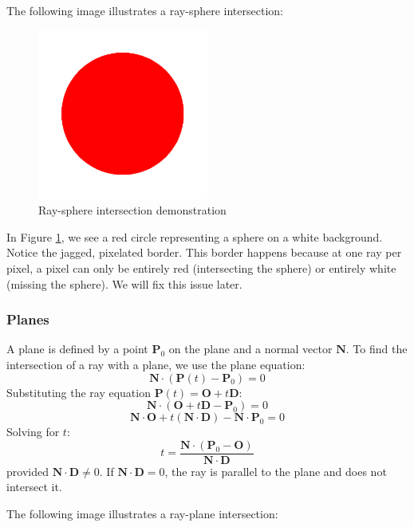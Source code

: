 \documentclass[12pt]{article}
\begin{document}
The following image illustrates a ray-sphere intersection:

\begin{figure}[H]
    \centering
    \includegraphics[width=0.5\textwidth]{images/intersections/ray_sphere_intersection.png}
    \caption{Ray-sphere intersection demonstration}
    \label{fig:raysphereintersection}
\end{figure}

In Figure \ref{fig:raysphereintersection}, we see a red circle representing a sphere on a white background. Notice the jagged, pixelated border. This border happens because at one ray per pixel, a pixel can only be entirely red (intersecting the sphere) or entirely white (missing the sphere). We will fix this issue later.

\subsubsection{Planes}
A plane is defined by a point \(\mathbf{P}_0\) on the plane and a normal vector \(\mathbf{N}\). To find the intersection of a ray with a plane, we use the plane equation:
\[
    \mathbf{N} \cdot \left( \mathbf{P}(t) - \mathbf{P}_0 \right) = 0
\]
Substituting the ray equation \(\mathbf{P}(t) = \mathbf{O} + t\mathbf{D}\):
\[
    \mathbf{N} \cdot \left( \mathbf{O} + t\mathbf{D} - \mathbf{P}_0 \right) = 0
\]
\[
    \mathbf{N} \cdot \mathbf{O} + t \left( \mathbf{N} \cdot \mathbf{D} \right) - \mathbf{N} \cdot \mathbf{P}_0 = 0
\]
Solving for \(t\):
\[
    t = \frac{\mathbf{N} \cdot (\mathbf{P}_0 - \mathbf{O})}{\mathbf{N} \cdot \mathbf{D}}
\]
provided \(\mathbf{N} \cdot \mathbf{D} \neq 0\). If \(\mathbf{N} \cdot \mathbf{D} = 0\), the ray is parallel to the plane and does not intersect it.

The following image illustrates a ray-plane intersection:
\end{document}
